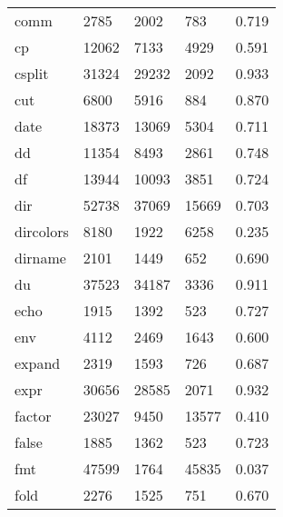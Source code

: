 \begin{longtable}{lp{3.0cm}p{3.0cm}p{3.0cm}p{3.0cm}}
comm      &                     2785 &         2002 &           783 &                    0.719 \\
cp        &                    12062 &         7133 &          4929 &                    0.591 \\
csplit    &                    31324 &        29232 &          2092 &                    0.933 \\
cut       &                     6800 &         5916 &           884 &                    0.870 \\
date      &                    18373 &        13069 &          5304 &                    0.711 \\
dd        &                    11354 &         8493 &          2861 &                    0.748 \\
df        &                    13944 &        10093 &          3851 &                    0.724 \\
dir       &                    52738 &        37069 &         15669 &                    0.703 \\
dircolors &                     8180 &         1922 &          6258 &                    0.235 \\
dirname   &                     2101 &         1449 &           652 &                    0.690 \\
du        &                    37523 &        34187 &          3336 &                    0.911 \\
echo      &                     1915 &         1392 &           523 &                    0.727 \\
env       &                     4112 &         2469 &          1643 &                    0.600 \\
expand    &                     2319 &         1593 &           726 &                    0.687 \\
expr      &                    30656 &        28585 &          2071 &                    0.932 \\
factor    &                    23027 &         9450 &         13577 &                    0.410 \\
false     &                     1885 &         1362 &           523 &                    0.723 \\
fmt       &                    47599 &         1764 &         45835 &                    0.037 \\
fold      &                     2276 &         1525 &           751 &                    0.670 \\

\end{longtable}
